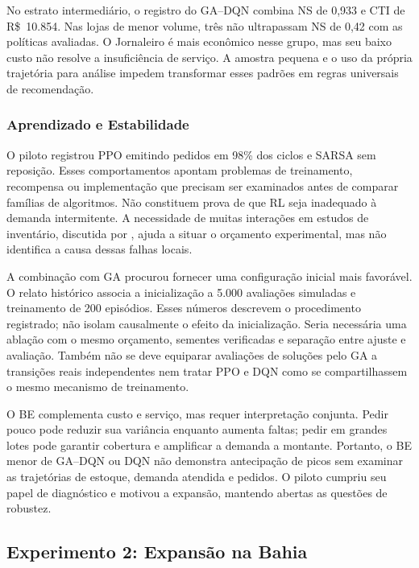 No estrato intermediário, o registro do GA--DQN combina NS de 0,933 e CTI de R\$~10.854. Nas lojas de menor volume, três não ultrapassam NS de 0,42 com as políticas avaliadas. O Jornaleiro é mais econômico nesse grupo, mas seu baixo custo não resolve a insuficiência de serviço. A amostra pequena e o uso da própria trajetória para análise impedem transformar esses padrões em regras universais de recomendação.

\subsubsection{Aprendizado e Estabilidade}

O piloto registrou PPO emitindo pedidos em 98\% dos ciclos e SARSA sem reposição. Esses comportamentos apontam problemas de treinamento, recompensa ou implementação que precisam ser examinados antes de comparar famílias de algoritmos. Não constituem prova de que RL seja inadequado à demanda intermitente. A necessidade de muitas interações em estudos de inventário, discutida por \citet{Oroojlooyjadid2022BeerGameDQN}, ajuda a situar o orçamento experimental, mas não identifica a causa dessas falhas locais.

A combinação com GA procurou fornecer uma configuração inicial mais favorável. O relato histórico associa a inicialização a 5.000 avaliações simuladas e treinamento de 200 episódios. Esses números descrevem o procedimento registrado; não isolam causalmente o efeito da inicialização. Seria necessária uma ablação com o mesmo orçamento, sementes verificadas e separação entre ajuste e avaliação. Também não se deve equiparar avaliações de soluções pelo GA a transições reais independentes nem tratar PPO e DQN como se compartilhassem o mesmo mecanismo de treinamento.

O BE complementa custo e serviço, mas requer interpretação conjunta. Pedir pouco pode reduzir sua variância enquanto aumenta faltas; pedir em grandes lotes pode garantir cobertura e amplificar a demanda a montante. Portanto, o BE menor de GA--DQN ou DQN não demonstra antecipação de picos sem examinar as trajetórias de estoque, demanda atendida e pedidos. O piloto cumpriu seu papel de diagnóstico e motivou a expansão, mantendo abertas as questões de robustez.

\subsection{Experimento 2: Expansão na Bahia}

